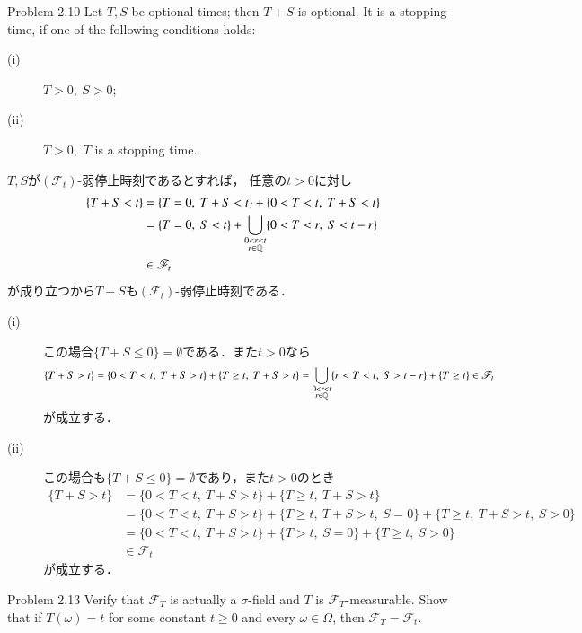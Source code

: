 	\begin{itembox}[l]{Problem 2.10}
		Let $T,S$ be optional times; then $T + S$ is optional. 
		It is a stopping time, if one of the following conditions holds:
		\begin{description}
			\item[(i)] $T > 0,\ S > 0$;
			\item[(ii)] $T > 0,$ $T$ is a stopping time.
		\end{description}
	\end{itembox}
	
	\begin{prf}
		$T,S$が$(\mathscr{F}_t)$-弱停止時刻であるとすれば，
		任意の$t > 0$に対し
		\begin{align}
			\{T + S < t\}
			&= \{T = 0,\ T + S < t\} + \{0 < T < t,\ T + S < t\} \\
			&= \{T = 0,\ S < t\} + \bigcup_{\substack{0 < r < t \\ r \in \mathbb{Q}}} \{0 < T < r,\ S < t-r\} \\
			&\in \mathscr{F}_t
		\end{align}
		が成り立つから$T + S$も$(\mathscr{F}_t)$-弱停止時刻である．
		\begin{description}
			\item[(i)] この場合$\{T + S \leq 0\} = \emptyset$である．また$t > 0$なら
				\begin{align}
					\{T + S > t\} = \{0 < T < t,\ T + S > t\} + \{T \geq t,\ T + S > t \}
					= \bigcup_{\substack{0 < r < t \\ r \in \mathbb{Q}}} \{r < T < t,\ S > t-r\} + \{T \geq t\} \in \mathscr{F}_t
				\end{align}
				が成立する．
				
			\item[(ii)]
				この場合も$\{T + S \leq 0\} = \emptyset$であり，また$t > 0$のとき
				\begin{align}
					\{T + S > t\} &= \{0 < T < t,\ T + S > t\} + \{T \geq t,\ T + S > t \} \\
					&= \{0 < T < t,\ T + S > t\} + \{T \geq t,\ T + S > t,\ S=0 \} + \{T \geq t,\ T + S > t,\ S>0 \} \\
					&= \{0 < T < t,\ T + S > t\} + \{T > t,\ S=0 \} + \{T \geq t,\ S>0 \} \\
					&\in \mathscr{F}_t
				\end{align}
				が成立する．
				\QED
		\end{description}
	\end{prf}
	
	\begin{itembox}[l]{Problem 2.13}
		Verify that $\mathscr{F}_T$ is actually a $\sigma$-field and $T$ is 
		$\mathscr{F}_T$-measurable. Show that if $T(\omega) = t$ for some constant 
		$t \geq 0$ and every $\omega \in \Omega$, then $\mathscr{F}_T = \mathscr{F}_t$.
	\end{itembox}
	
